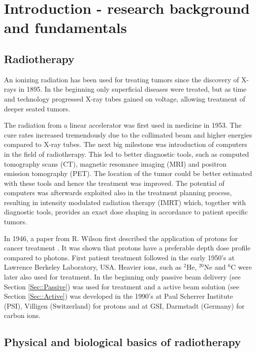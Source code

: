 \documentclass[type=dr, dr=rernat, accentcolor=tud7b,colorbacktitle, bigchapter, openright, twoside, 12pt ]{tudthesis}
\begin{document}
\chapter{Introduction - research background and fundamentals}
\label{chapter:intro}
\minitoc

\section{Radiotherapy}

An ionizing radiation has been used for treating tumors since the discovery of X-rays in 1895. In the beginning only superficial diseases were treated, but as time and technology progressed X-ray tubes gained on voltage, allowing treatment of deeper seated tumors.

The radiation from a linear accelerator was first used in medicine in 1953. The cure rates increased tremendously due to the collimated beam and higher energies compared to X-ray tubes. The next big milestone was introduction of computers in the field
of radiotherapy. This led to better diagnostic tools, such as computed tomography scans (CT), magnetic resonance imaging (MRI) and
positron emission tomography (PET). The location of the tumor could be better estimated with these tools and hence the treatment was improved. The potential of computers was afterwards exploited also in the treatment planning process, resulting in intensity modulated
radiation therapy (IMRT) which, together with diagnostic tools, provides an exact dose shaping in accordance to patient specific tumors.

In 1946, a paper from R. Wilson first described the application of protons for cancer treatment \cite{Wilson1946}. It was shown that protons have a preferable depth dose profile compared to photons. First patient treatment followed in the early 1950's at Lawrence Berkeley Laboratory, USA. Heavier ions, such as 
$^{2}$He, $^{20}$Ne and $^6$C were later also used for treatment. In the beginning only passive beam delivery (see Section \ref{Sec::Passive}) was used for treatment and a active beam solution (see Section \ref{Sec::Active}) was developed in the 1990's at Paul Scherrer Institute (PSI), Villigen (Switzerland) for protons and at GSI, Darmstadt (Germany) for carbon ions.


\section{Physical and biological basics of radiotherapy}
\end{document}
